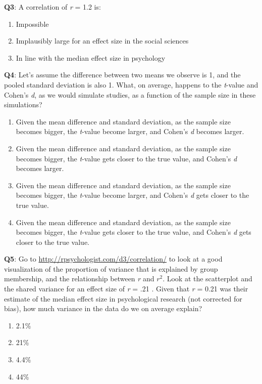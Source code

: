 \documentclass[
  oneside]{book}
\providecommand{\tightlist}{%
  \setlength{\itemsep}{0pt}\setlength{\parskip}{0pt}}
\begin{document}
\textbf{Q3}: A correlation of \emph{r} = 1.2 is:

\begin{enumerate}
\def\labelenumi{\Alph{enumi})}
\tightlist
\item
  Impossible
\item
  Implausibly large for an effect size in the social sciences
\item
  In line with the median effect size in psychology
\end{enumerate}

\textbf{Q4}: Let's assume the difference between two means we observe is 1, and the pooled standard deviation is also 1. What, on average, happens to the \emph{t}-value and Cohen's \emph{d}, as we would simulate studies, as a function of the sample size in these simulations?

\begin{enumerate}
\def\labelenumi{\Alph{enumi})}
\tightlist
\item
  Given the mean difference and standard deviation, as the sample size becomes bigger, the \emph{t}-value become larger, and Cohen's \emph{d} becomes larger.
\item
  Given the mean difference and standard deviation, as the sample size becomes bigger, the \emph{t}-value gets closer to the true value, and Cohen's \emph{d} becomes larger.
\item
  Given the mean difference and standard deviation, as the sample size becomes bigger, the \emph{t}-value become larger, and Cohen's \emph{d} gets closer to the true value.
\item
  Given the mean difference and standard deviation, as the sample size becomes bigger, the \emph{t}-value gets closer to the true value, and Cohen's \emph{d} gets closer to the true value.
\end{enumerate}

\textbf{Q5}: Go to \url{http://rpsychologist.com/d3/correlation/} to look at a good visualization of the proportion of variance that is explained by group membership, and the relationship between \emph{r} and \(r^2\). Look at the scatterplot and the shared variance for an effect size of \emph{r} = .21 \citep{richard_one_2003}. Given that \emph{r} = 0.21 was their estimate of the median effect size in psychological research (not corrected for bias), how much variance in the data do we on average explain?

\begin{enumerate}
\def\labelenumi{\Alph{enumi})}
\tightlist
\item
  2.1\%
\item
  21\%
\item
  4.4\%
\item
  44\%
\end{enumerate}
\end{document}
